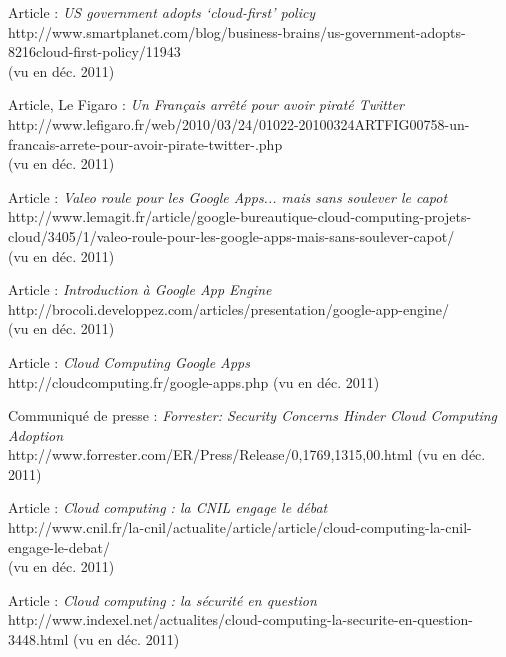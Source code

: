 \documentclass[a4paper,12pt]{report}
\begin{document}
\begin{onehalfspace}
	\listoffigures

	\renewcommand\bibname{Webographie}
\begin{flushleft}
	\begin{thebibliography}{9}
	  Article : \textit{US government adopts ‘cloud-first’ policy} \\
http://www.smartplanet.com/blog/business-brains/us-government-adopts-8216cloud-first-policy/11943 \\(vu en déc. 2011)

	  Article, Le Figaro : \textit{Un Français arrêté pour avoir piraté Twitter} \\
http://www.lefigaro.fr/web/2010/03/24/01022-20100324ARTFIG00758-un-francais-arrete-pour-avoir-pirate-twitter-.php \\(vu en déc. 2011)

	 Article : \textit{Valeo roule pour les Google Apps... mais sans soulever le capot}\\
http://www.lemagit.fr/article/google-bureautique-cloud-computing-projets-cloud/3405/1/valeo-roule-pour-les-google-apps-mais-sans-soulever-capot/ \\ (vu en déc. 2011)

	 Article : \textit{Introduction à Google App Engine} \\
http://brocoli.developpez.com/articles/presentation/google-app-engine/ \\(vu en déc. 2011)

	 Article : \textit{Cloud Computing Google Apps} \\
http://cloudcomputing.fr/google-apps.php (vu en déc. 2011)

	 Communiqué de presse : \textit{Forrester: Security Concerns Hinder Cloud Computing Adoption} \\
http://www.forrester.com/ER/Press/Release/0,1769,1315,00.html (vu en déc. 2011)

	 Article : \textit{Cloud computing : la CNIL engage le débat} \\
http://www.cnil.fr/la-cnil/actualite/article/article/cloud-computing-la-cnil-engage-le-debat/ \\ (vu en déc. 2011)

	 Article : \textit{Cloud computing : la sécurité en question} \\
http://www.indexel.net/actualites/cloud-computing-la-securite-en-question-3448.html (vu en déc. 2011)


\end{thebibliography}
\end{flushleft}
\end{onehalfspace}
\end{document}
